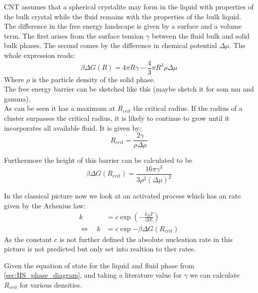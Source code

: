 CNT assumes that a spherical crystalite may form in the liquid with properties of the bulk crystal while the fluid remains with the properties of the bulk liquid. The difference in the free energy landscape is given by a surface and a volume term. The first arises from the surface tension $\gamma$ between the fluid bulk and solid bulk phases. The second comes by the difference in chemical potential $\Delta \mu$. The whole expression reads:
\begin{equation}
\beta \Delta G(R) =4 \pi R \gamma -\frac{4}{3} \pi R^3 \rho \Delta \mu  
\end{equation}
Where $\rho$ is the particle density of the solid phase.\\

The free energy barrier can be sketched like this (maybe sketch it for som mu and gamma).\\

As can be seen it has a maximum at $R_{crit}$ the critical radius. If the radius of a cluster surpasses the critical radius, it is likely to continue to grow until it incorporates all available fluid. It is given by:
\begin{equation}
R_{crit} = \frac{2 \gamma}{\rho \Delta \mu }
\end{equation}

Furthermore the height of this barrier can be calculated to be 
\begin{equation}
\beta \Delta G (R_{crit}) = \frac{16 \pi \gamma^3}{3 \rho^2 (\Delta \mu )^2}
\end{equation}

In the classical picture now we look at an activated process which has an rate given by the Arhenius law:
\begin{align}
k&=c \exp{(-\frac{k_B T}{\Delta E})}\\
\Leftrightarrow \quad k &=c \exp{-\beta \Delta G (R_{crit})}
\end{align}
As the constant c is not further defined the absolute nucleation rate in this picture is not predicted but only set into realtion to ther rates. 

Given the equation of state for the liquid and fluid phase from \autoref{sec:HS_phase_diagram}, and taking a literature value for $\gamma$  we can calculate $R_{crit}$ for various densities.


